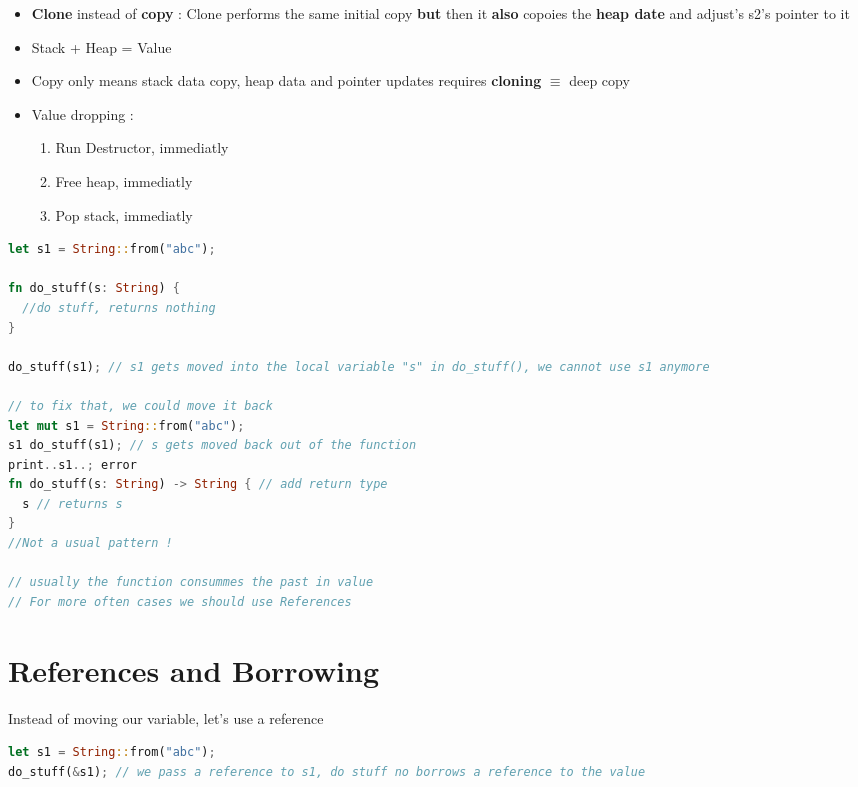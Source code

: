 \documentclass{report}
\begin{document}
\begin{multicols*}{2}
\begin{itemize}
  \item \textbf{Clone} instead of \textbf{copy} : Clone performs the same initial copy
    \textbf{but} then it \textbf{also} copoies the \textbf{heap date} and adjust's s2's pointer to it 
    \item Stack + Heap = Value 
    \item Copy only means stack data copy, heap data and pointer updates requires \textbf{cloning} $\equiv $ deep copy 
    \item Value dropping :
      \begin{enumerate}
        \item Run Destructor, immediatly 
        \item Free heap, immediatly 
        \item Pop stack, immediatly
      \end{enumerate}
\end{itemize}

\begin{tcolorbox}[title=Another move situation,colback=backcolour,size=small,left=4mm]
\begin{lstlisting}[language=rust]
let s1 = String::from("abc");

fn do_stuff(s: String) {
  //do stuff, returns nothing
}

do_stuff(s1); // s1 gets moved into the local variable "s" in do_stuff(), we cannot use s1 anymore

// to fix that, we could move it back
let mut s1 = String::from("abc"); 
s1 do_stuff(s1); // s gets moved back out of the function
print..s1..; error
fn do_stuff(s: String) -> String { // add return type 
  s // returns s
}
//Not a usual pattern !

// usually the function consummes the past in value
// For more often cases we should use References

\end{lstlisting}
\end{tcolorbox}

\section{References and Borrowing}

Instead of moving our variable, let's use a reference
\begin{tcolorbox}[colback=backcolour,size=small,left=4mm]
\begin{lstlisting}[language=rust]
let s1 = String::from("abc");
do_stuff(&s1); // we pass a reference to s1, do stuff no borrows a reference to the value


\end{lstlisting}
\end{tcolorbox}
\end{multicols*}
\end{document}
